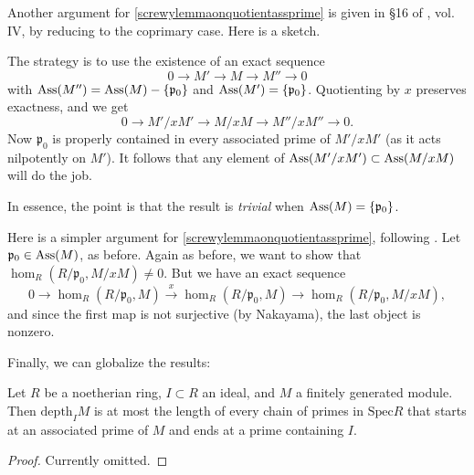 \begin{exercise} 
Another argument  for \cref{screwylemmaonquotientassprime} is given in \S 16 of \cite{EGA}, vol. IV, by reducing to
the coprimary case. Here is a sketch.

The strategy is to use the existence of an exact sequence
\[ 0 \to M' \to M \to M'' \to 0  \]
with $\operatorname{Ass}(M'') = \operatorname{Ass}(M) - \left\{\mathfrak{p}_0\right\}$ and
$\operatorname{Ass}(M') = \left\{\mathfrak{p}_0\right\}$. 
Quotienting by $x$ preserves exactness, and we get
\[ 0 \to M'/xM' \to M/xM \to M''/xM'' \to 0.  \]
Now $\mathfrak{p}_0$ is properly contained in every associated prime of
$M'/xM'$ (as it acts nilpotently on $M'$). It follows that any element of
$\operatorname{Ass}(M'/xM') \subset \operatorname{Ass}(M/xM)$ will do the job.

In essence, the point is that the result is \emph{trivial} when $\operatorname{Ass}(M)
= \left\{\mathfrak{p}_0\right\}$.
\end{exercise} 

\begin{exercise} 
Here is a simpler argument for \cref{screwylemmaonquotientassprime},
following \cite{Se65}. 
Let $\mathfrak{p}_0 \in \operatorname{Ass}(M)$, as before. Again as before, we want  to show that
$\hom_R(R/\mathfrak{p}_0, M/xM) \neq 0$.
But we have an exact sequence 
\[ 0 \to \hom_R(R/\mathfrak{p}_0, M) 
\stackrel{x}{\to} \hom_R(R/\mathfrak{p}_0, M) \to
\hom_R(R/\mathfrak{p}_0, M/xM) ,
\]
and since the first map is not surjective (by Nakayama), the last
object is nonzero.
\end{exercise} 

Finally, we can globalize the results:

\begin{proposition} 
Let $R$ be a noetherian ring, $I \subset R$ an ideal, and $M$ a finitely
generated module. Then $\mathrm{depth}_I M$ is at most the length of every  chain
of primes in $\mathrm{Spec} R$ that starts at an associated prime of $M$ and
ends at a prime containing $I$.
\end{proposition} 

\begin{proof} Currently omitted. 
\begin{comment}
Consider a chain of primes $\mathfrak{p}_0 \subset \dots \subset
\mathfrak{p}_k$ where $\mathfrak{p}_0$ is an associated prime and
$\mathfrak{p}_k$ contains $I$. 
The goal is to show that 
\[  \mathrm{depth}_I M \leq k .  \]
By localization, we can assume that $\mathfrak{p}_k$ is the maximal ideal of
$R$; recall that localization can only increase the depth.
We can also assume $I$ is this maximal ideal, by increasing it.

In this case, the result follows from the local version
(\cref{localdepthassbound}). 
\end{comment}
\end{proof}


